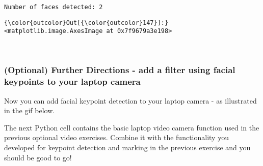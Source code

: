 \documentclass[11pt]{article}
\begin{document}
    \begin{Verbatim}[commandchars=\\\{\}]
Number of faces detected: 2

    \end{Verbatim}

\begin{Verbatim}[commandchars=\\\{\}]
{\color{outcolor}Out[{\color{outcolor}147}]:} <matplotlib.image.AxesImage at 0x7f9679a3e198>
\end{Verbatim}
            
    \begin{center}
    \end{center}
    { \hspace*{\fill} \\}
    
    \hypertarget{optional-further-directions---add-a-filter-using-facial-keypoints-to-your-laptop-camera}{%
\subsubsection{(Optional) Further Directions - add a filter using facial
keypoints to your laptop
camera}\label{optional-further-directions---add-a-filter-using-facial-keypoints-to-your-laptop-camera}}

Now you can add facial keypoint detection to your laptop camera - as
illustrated in the gif below.

The next Python cell contains the basic laptop video camera function
used in the previous optional video exercises. Combine it with the
functionality you developed for keypoint detection and marking in the
previous exercise and you should be good to go!
\end{document}
